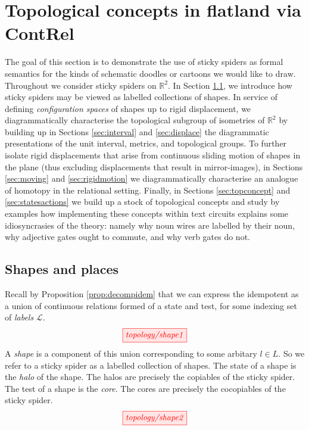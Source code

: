 \section{Topological concepts in flatland via \textbf{ContRel}}

The goal of this section is to demonstrate the use of sticky spiders as formal semantics for the kinds of schematic doodles or cartoons we would like to draw. Throughout we consider sticky spiders on $\mathbb{R}^2$. In Section \ref{sec:shapes}, we introduce how sticky spiders may be viewed as labelled collections of shapes. In service of defining \emph{configuration spaces} of shapes up to rigid displacement, we diagrammatically characterise the topological subgroup of isometries of $\mathbb{R}^2$ by building up in Sections \ref{sec:interval} and \ref{sec:displace} the diagrammatic presentations of the unit interval, metrics, and topological groups. To further isolate rigid displacements that arise from continuous sliding motion of shapes in the plane (thus excluding displacements that result in mirror-images), in Sections \ref{sec:moving} and \ref{sec:rigidmotion} we diagrammatically characterise an analogue of homotopy in the relational setting. Finally, in Sections \ref{sec:topconcept} and \ref{sec:statesactions} we build up a stock of topological concepts and study by examples how implementing these concepts within text circuits explains some idiosyncrasies of the theory: namely why noun wires are labelled by their noun, why adjective gates ought to commute, and why verb gates do not.

\subsection{Shapes and places}\label{sec:shapes}

\begin{defn}
Recall by Proposition \ref{prop:decompidem} that we can express the idempotent as a union of continuous relations formed of a state and test, for some indexing set of \emph{labels} $\mathcal{L}$.
\[\tikzfig{topology/shape1}\]
A \emph{shape} is a component of this union corresponding to some arbitary $l \in L$. So we refer to a sticky spider as a labelled collection of shapes. The state of a shape is the \emph{halo} of the shape. The halos are precisely the copiables of the sticky spider. The test of a shape is the \emph{core}. The cores are precisely the cocopiables of the sticky spider.
\[\tikzfig{topology/shape2}\]
\end{defn}

